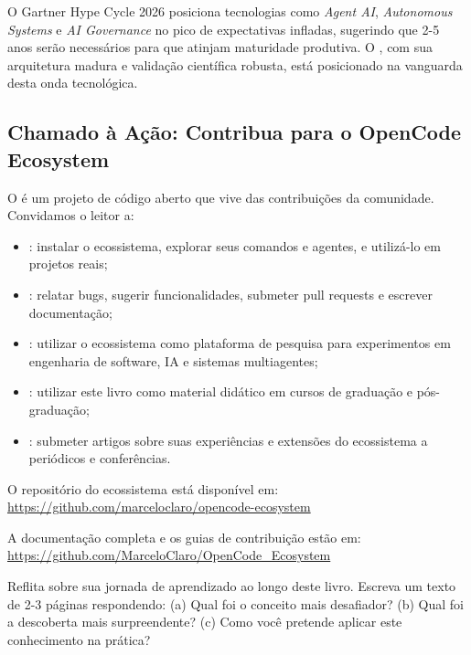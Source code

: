 O Gartner Hype Cycle 2026 \cite{gartner2026hype} posiciona tecnologias como
\textit{Agent AI}, \textit{Autonomous Systems} e \textit{AI Governance} no
pico de expectativas infladas, sugerindo que 2-5 anos serão necessários para
que atinjam maturidade produtiva. O \opencodeeco{}, com sua arquitetura
madura e validação científica robusta, está posicionado na vanguarda desta
onda tecnológica.

\subsection{Chamado à Ação: Contribua para o OpenCode Ecosystem}

O \opencodeeco{} é um projeto de código aberto que vive das contribuições da
comunidade. Convidamos o leitor a:

\begin{itemize}
\item {}: instalar o ecossistema, explorar seus comandos
      e agentes, e utilizá-lo em projetos reais;
\item {}: relatar bugs, sugerir funcionalidades, submeter
      pull requests e escrever documentação;
\item {}: utilizar o ecossistema como plataforma de pesquisa
      para experimentos em engenharia de software, IA e sistemas multiagentes;
\item {}: utilizar este livro como material didático em cursos
      de graduação e pós-graduação;
\item {}: submeter artigos sobre suas experiências e
      extensões do ecossistema a periódicos e conferências.
\end{itemize}

O repositório do ecossistema está disponível em:
\url{https://github.com/marceloclaro/opencode-ecosystem}

A documentação completa e os guias de contribuição estão em:
\url{https://github.com/MarceloClaro/OpenCode_Ecosystem}

\begin{exercicio}
    Reflita sobre sua jornada de aprendizado ao longo deste livro. Escreva um
    texto de 2-3 páginas respondendo: (a) Qual foi o conceito mais desafiador?
    (b) Qual foi a descoberta mais surpreendente? (c) Como você pretende
    aplicar este conhecimento na prática?
\end{exercicio}

